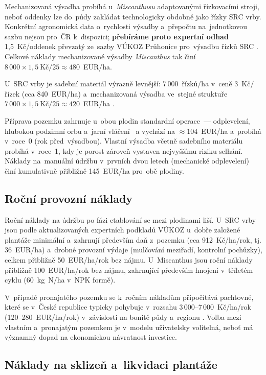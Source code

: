 Mechanizovaná výsadba probíhá u~\textit{Miscanthusu} adaptovanými
řízkovacími stroji, neboť oddenky lze do~půdy zakládat technologicky
obdobně jako řízky SRC vrby. Konkrétní agronomická data o~rychlosti
výsadby a~přepočtu na~jednotkovou sazbu nejsou pro~ČR k~dispozici;
\textbf{přebíráme proto expertní odhad} 1,5~Kč/oddenek převzatý
ze~sazby VÚKOZ Průhonice pro~výsadbu řízků SRC \citep{VUKOZ2026}.
Celkové náklady mechanizované výsadby \textit{Miscanthus} tak činí
$8\,000 \times 1{,}5~\text{K\v{c}} / 25 \approx 480$~EUR/ha.

U~SRC vrby je sadební materiál výrazně levnější: 7\,000~řízků/ha v~ceně
3~Kč/řízek (cca 840~EUR/ha) a~mechanizovaná výsadba ve~stejné struktuře
$7\,000 \times 1{,}5~\text{K\v{c}} / 25 \approx 420$~EUR/ha
\citep{VUKOZ2026}. 

Příprava pozemku zahrnuje u~obou plodin standardní operace~---
odplevelení, hlubokou podzimní orbu a~jarní vláčení~ a vychází na $\approx 104$~EUR/ha a~probíhá v~roce~0 (rok před~výsadbou). Vlastní výsadba
včetně sadebního materiálu probíhá v~roce~1, kdy je porost zároveň
vystaven nejvyššímu riziku selhání. Náklady na~manuální údržbu
v~prvních dvou letech (mechanické odplevelení) činí kumulativně
přibližně 145~EUR/ha pro~obě plodiny.

\subsection*{Roční provozní náklady}

Roční náklady na údržbu po fázi etablování se mezi plodinami liší.
U~SRC vrby jsou podle aktualizovaných expertních podkladů VÚKOZ
\citep{VUKOZ2026} u~dobře založené plantáže minimální a~zahrnují
především daň z~pozemku (cca 912~Kč/ha/rok, tj. 36~EUR/ha)
a~drobné provozní výdaje (mulčování meziřadí, kontrolní pochůzky),
celkem přibližně 50~EUR/ha/rok bez nájmu.
U~Miscanthus jsou roční náklady přibližně 100~EUR/ha/rok bez nájmu,
zahrnující především hnojení v~tříletém cyklu (60~kg~N/ha v~NPK formě)\citep{Weger2021}.

V~případě pronajatého pozemku se k~ročním nákladům připočítává
pachtovné, které se v~České republice typicky pohybuje v~rozsahu
3\,000--7\,000~Kč/ha/rok (120--280~EUR/ha/rok) v~závislosti na bonitě
půdy a~regionu \citep{VUKOZ2026}. Volba mezi vlastním
a~pronajatým pozemkem je v~modelu uživatelsky volitelná, neboť má
významný dopad na ekonomickou návratnost investice.

\subsection*{Náklady na sklizeň a~likvidaci plantáže}

